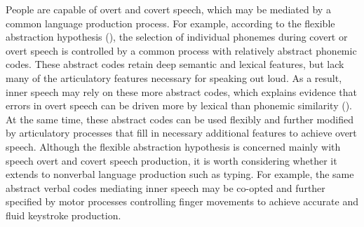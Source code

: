 \documentclass[,man,floatsintext]{apa6}
\begin{document}
People are capable of overt and covert speech, which may be mediated by a common language production process. For example, according to the flexible abstraction hypothesis (), the selection of individual phonemes during covert or overt speech is controlled by a common process with relatively abstract phonemic codes. These abstract codes retain deep semantic and lexical features, but lack many of the articulatory features necessary for speaking out loud. As a result, inner speech may rely on these more abstract codes, which explains evidence that errors in overt speech can be driven more by lexical than phonemic similarity (). At the same time, these abstract codes can be used flexibly and further modified by articulatory processes that fill in necessary additional features to achieve overt speech. Although the flexible abstraction hypothesis is concerned mainly with speech overt and covert speech production, it is worth considering whether it extends to nonverbal language production such as typing. For example, the same abstract verbal codes mediating inner speech may be co-opted and further specified by motor processes controlling finger movements to achieve accurate and fluid keystroke production.
\end{document}
